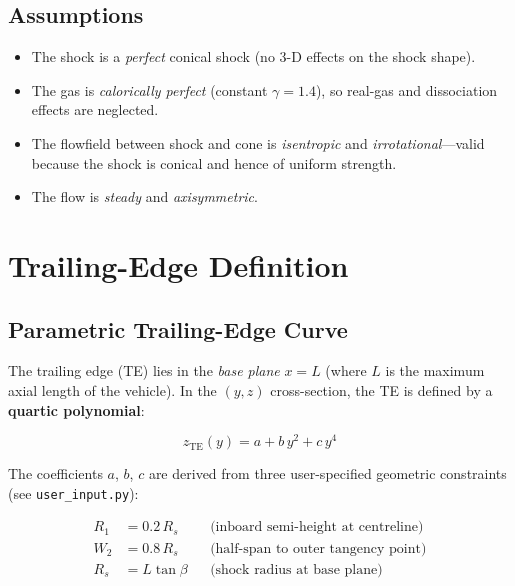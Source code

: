 \documentclass[12pt,a4paper]{article}
\begin{document}
\subsection{Assumptions}

\begin{itemize}[leftmargin=*]
    \item The shock is a \emph{perfect} conical shock (no 3-D effects on the
          shock shape).
    \item The gas is \emph{calorically perfect} (constant $\gamma = 1.4$), so
          real-gas and dissociation effects are neglected.
    \item The flowfield between shock and cone is \emph{isentropic} and
          \emph{irrotational}---valid because the shock is conical and hence
          of uniform strength.
    \item The flow is \emph{steady} and \emph{axisymmetric}.
\end{itemize}

\section{Trailing-Edge Definition}
\label{sec:TE}

\subsection{Parametric Trailing-Edge Curve}

The trailing edge (TE) lies in the \emph{base plane} $x = L$ (where $L$ is
the maximum axial length of the vehicle).  In the $(y, z)$ cross-section, the
TE is defined by a \textbf{quartic polynomial}:

\begin{equation}
    z_{\mathrm{TE}}(y) = a + b\,y^2 + c\,y^4
    \label{eq:TE}
\end{equation}

The coefficients $a$, $b$, $c$ are derived from three user-specified geometric
constraints (see \texttt{user\_input.py}):

\begin{align}
    R_1 &= 0.2\,R_s & &\text{(inboard semi-height at centreline)}\\
    W_2 &= 0.8\,R_s & &\text{(half-span to outer tangency point)}\\
    R_s &= L\tan\beta      & &\text{(shock radius at base plane)}
\end{align}
\end{document}
